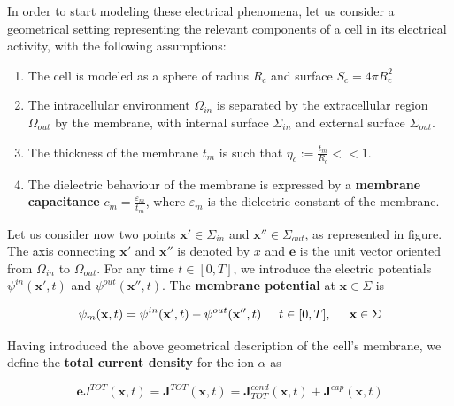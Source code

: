 \documentclass[a4paper]{article}
\begin{document}
In order to start modeling these electrical phenomena, let us consider a geometrical setting representing the relevant components of a cell in its electrical activity, with the following assumptions:

\begin{enumerate}
	\item The cell is modeled as a sphere of radius $R_c$ and surface $ S_c = 4\pi R_c^2$
	
	\item The intracellular environment $\Omega_{in}$ is separated by the extracellular region $\Omega_{out}$ by the membrane, with internal surface $\Sigma_{in}$ and external surface $\Sigma_{out}$.%
	
	\item The thickness of the membrane $t_m$ is such that $ \eta_c := \frac{t_m}{R_c} << 1$. 
	
	\item The dielectric behaviour of the membrane is expressed by a \textbf{membrane capacitance}  $ c_m = \frac{\varepsilon_m}{t_m} $, where $\varepsilon_m$ is the dielectric constant of the membrane.
\end{enumerate}

Let us consider now two points $ \textbf{x}' \in \Sigma_{in}$ and $ \textbf{x}'' \in \Sigma_{out}$, as represented in figure. The axis connecting $ \textbf{x}'$ and $ \textbf{x}''$ is denoted by $x$ and $\textbf{e}$ is the unit vector oriented from $\Omega_{in}$ to $\Omega_{out}$. For any time $ t \in [0,T]$, we introduce the electric potentials $ \psi^{in} (\textbf{x}',t) $ and  $ \psi^{out} (\textbf{x}'',t) $. The \textbf{membrane potential} at $ \textbf{x} \in \Sigma$ is 

\begin{equation}
\psi_m (\textbf{x},t) = \psi^{in} (\textbf{x}',t) -  \psi^{out} (\textbf{x}'',t) \hspace{0.5 cm}  t \in [0,T], \hspace{0.5 cm} \textbf{x} \in \Sigma
\end{equation}



Having introduced the above geometrical description of the cell's membrane, we define the \textbf{total current density} for the  ion $\alpha$ as

\begin{equation}
\textbf{e} J^{TOT}(\textbf{x},t) =	\textbf{J}^{TOT}(\textbf{x},t) = \textbf{J}^{cond}_{TOT}(\textbf{x},t) +\textbf{J}^{cap}(\textbf{x},t) 
\end{equation}	
\end{document}
